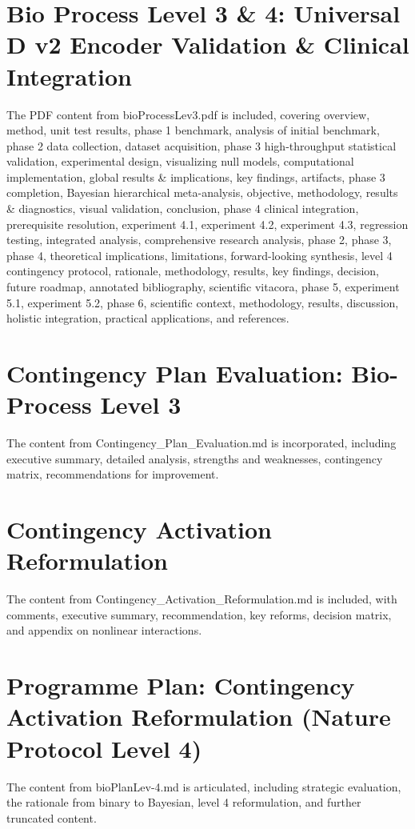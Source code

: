 \documentclass{article}
\begin{document}
\section{Bio Process Level 3 \& 4: Universal D v2 Encoder Validation \& Clinical Integration}
The PDF content from bioProcessLev3.pdf is included, covering overview, method, unit test results, phase 1 benchmark, analysis of initial benchmark, phase 2 data collection, dataset acquisition, phase 3 high-throughput statistical validation, experimental design, visualizing null models, computational implementation, global results \& implications, key findings, artifacts, phase 3 completion, Bayesian hierarchical meta-analysis, objective, methodology, results \& diagnostics, visual validation, conclusion, phase 4 clinical integration, prerequisite resolution, experiment 4.1, experiment 4.2, experiment 4.3, regression testing, integrated analysis, comprehensive research analysis, phase 2, phase 3, phase 4, theoretical implications, limitations, forward-looking synthesis, level 4 contingency protocol, rationale, methodology, results, key findings, decision, future roadmap, annotated bibliography, scientific vitacora, phase 5, experiment 5.1, experiment 5.2, phase 6, scientific context, methodology, results, discussion, holistic integration, practical applications, and references.

\section{Contingency Plan Evaluation: Bio-Process Level 3}
The content from Contingency\_Plan\_Evaluation.md is incorporated, including executive summary, detailed analysis, strengths and weaknesses, contingency matrix, recommendations for improvement.

\section{Contingency Activation Reformulation}
The content from Contingency\_Activation\_Reformulation.md is included, with comments, executive summary, recommendation, key reforms, decision matrix, and appendix on nonlinear interactions.

\section{Programme Plan: Contingency Activation Reformulation (Nature Protocol Level 4)}
The content from bioPlanLev-4.md is articulated, including strategic evaluation, the rationale from binary to Bayesian, level 4 reformulation, and further truncated content.
\end{document}
